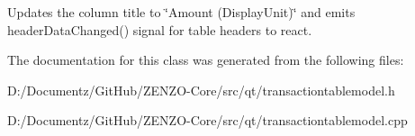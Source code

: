 Updates the column title to \char`\"{}\+Amount (\+Display\+Unit)\char`\"{} and emits header\+Data\+Changed() signal for table headers to react. 

The documentation for this class was generated from the following files\+:\begin{DoxyCompactItemize}
\item 
D\+:/\+Documentz/\+Git\+Hub/\+Z\+E\+N\+Z\+O-\/\+Core/src/qt/transactiontablemodel.\+h\item 
D\+:/\+Documentz/\+Git\+Hub/\+Z\+E\+N\+Z\+O-\/\+Core/src/qt/transactiontablemodel.\+cpp\end{DoxyCompactItemize}
